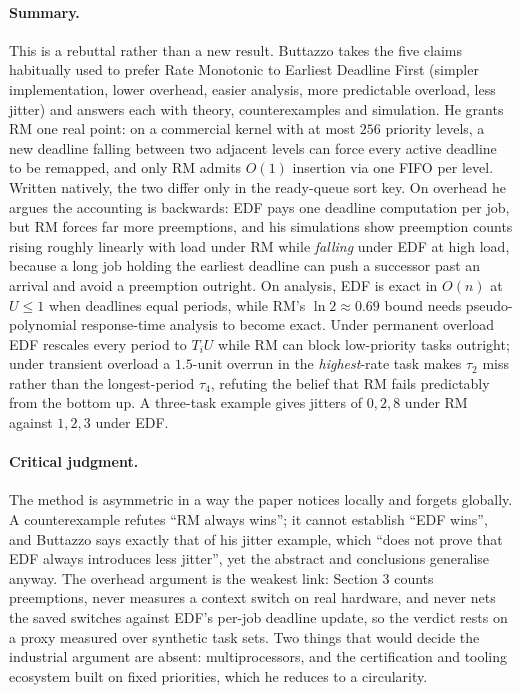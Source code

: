 \paragraph{Summary.}
This is a rebuttal rather than a new result. Buttazzo takes the five claims habitually used to
prefer Rate Monotonic to Earliest Deadline First (simpler implementation, lower overhead, easier
analysis, more predictable overload, less jitter) and answers each with theory, counterexamples
and simulation. He grants RM one real point: on a commercial kernel with at most $256$ priority
levels, a new deadline falling between two adjacent levels can force every active deadline to be
remapped, and only RM admits $O(1)$ insertion via one FIFO per level. Written natively, the two
differ only in the ready-queue sort key. On overhead he argues
the accounting is backwards: EDF pays one deadline computation per job, but RM forces far more
preemptions, and his simulations show preemption counts rising roughly linearly with load under
RM while \emph{falling} under EDF at high load, because a long job holding the earliest deadline
can push a successor past an arrival and avoid a preemption outright. On analysis, EDF is exact
in $O(n)$ at $U \le 1$ when deadlines equal periods, while RM's $\ln 2 \approx 0.69$ bound needs
pseudo-polynomial response-time analysis to become exact.
Under permanent overload EDF rescales every period to $T_i U$ while RM can
block low-priority tasks outright; under transient overload a $1.5$-unit overrun in the
\emph{highest}-rate task makes $\tau_2$ miss rather than the longest-period $\tau_4$, refuting
the belief that RM fails predictably from the bottom up. A three-task example gives jitters of
$0, 2, 8$ under RM against $1, 2, 3$ under EDF.

\paragraph{Critical judgment.}
The method is asymmetric in a way the paper notices locally and forgets globally. A
counterexample refutes ``RM always wins''; it cannot establish ``EDF wins'', and Buttazzo says
exactly that of his jitter example, which ``does not prove that EDF always introduces less
jitter'', yet the abstract and conclusions generalise anyway. The overhead argument is the
weakest link: Section 3 counts preemptions, never measures a context switch on real hardware, and
never nets the saved switches against EDF's per-job deadline update, so the verdict rests on a
proxy measured over synthetic task sets. Two things that would decide the industrial argument are
absent: multiprocessors, and the certification and tooling ecosystem built on fixed priorities,
which he reduces to a circularity.

